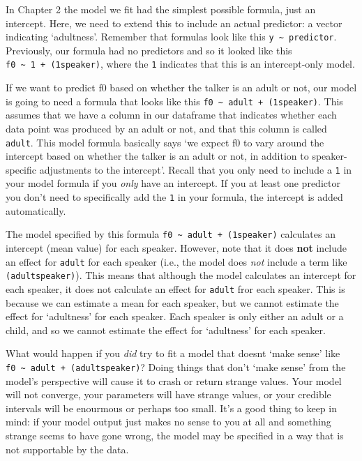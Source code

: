 \documentclass[
]{book}
\begin{document}
In Chapter 2 the model we fit had the simplest possible formula, just an intercept. Here, we need to extend this to include an actual predictor: a vector indicating `adultness'. Remember that formulas look like this \texttt{y\ \textasciitilde{}\ predictor}. Previously, our formula had no predictors and so it looked like this \texttt{f0\ \textasciitilde{}\ 1\ +\ (1\textbar{}speaker)}, where the \texttt{1} indicates that this is an intercept-only model.

If we want to predict f0 based on whether the talker is an adult or not, our model is going to need a formula that looks like this \texttt{f0\ \textasciitilde{}\ adult\ +\ (1\textbar{}speaker)}. This assumes that we have a column in our dataframe that indicates whether each data point was produced by an adult or not, and that this column is called \texttt{adult}. This model formula basically says `we expect f0 to vary around the intercept based on whether the talker is an adult or not, in addition to speaker-specific adjustments to the intercept'. Recall that you only need to include a \texttt{1} in your model formula if you \emph{only} have an intercept. If you at least one predictor you don't need to specifically add the \texttt{1} in your formula, the intercept is added automatically.

The model specified by this formula \texttt{f0\ \textasciitilde{}\ adult\ +\ (1\textbar{}speaker)} calculates an intercept (mean value) for each speaker. However, note that it does \textbf{not} include an effect for \texttt{adult} for each speaker (i.e., the model does \emph{not} include a term like \texttt{(adult\textbar{}speaker)}). This means that although the model calculates an intercept for each speaker, it does not calculate an effect for \texttt{adult} fror each speaker. This is because we can estimate a mean for each speaker, but we cannot estimate the effect for `adultness' for each speaker. Each speaker is only either an adult or a child, and so we cannot estimate the effect for `adultness' for each speaker.

What would happen if you \emph{did} try to fit a model that doesnt `make sense' like \texttt{f0\ \textasciitilde{}\ adult\ +\ (adult\textbar{}speaker)}? Doing things that don't `make sense' from the model's perspective will cause it to crash or return strange values. Your model will not converge, your parameters will have strange values, or your credible intervals will be enourmous or perhaps too small. It's a good thing to keep in mind: if your model output just makes no sense to you at all and something strange seems to have gone wrong, the model may be specified in a way that is not supportable by the data.
\end{document}
